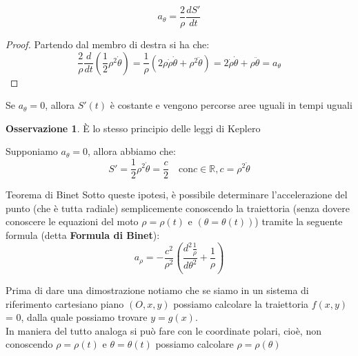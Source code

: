 \documentclass[11pt,a4paper,twoside]{article}
\theoremstyle{definition}
\newtheorem*{oss}{Osservazione}
\begin{document}
\begin{prop}{}{}
	\[ a_\theta = \frac 2 \rho \frac{dS'}{dt} \]
\end{prop}

\begin{proof}
	Partendo dal membro di destra si ha che:
	\[ \frac 2\rho \frac{d}{dt}\left( \frac 12 \rho^2 \dot \theta \right) = \frac 1\rho (2 \rho \dot \rho \dot \theta + \rho^2 \ddot \theta) = 2 \dot \rho \dot \theta + \rho \ddot \theta = a_\theta \]
\end{proof}

\begin{cor}
	Se $a_\theta = 0$, allora $S'(t)$ è costante e vengono percorse aree uguali in tempi uguali
\end{cor}

\begin{oss}
	È lo stesso principio delle leggi di Keplero
\end{oss}

Supponiamo $a_\theta = 0$, allora abbiamo che:
\[ S' = \frac 12 \rho^2 \dot \theta = \frac c2 \quad \text{con} c \in \mathbb R, c = \rho^2 \dot \theta \]

\begin{thm}{Teorema di Binet}{}
	Sotto queste ipotesi, è possibile determinare l'accelerazione del punto (che è tutta radiale) semplicemente conoscendo la traiettoria (senza dovere conoscere le equazioni del moto $\rho = \rho(t)$ e $(\theta = \theta(t))$) tramite la seguente formula (detta \textbf{Formula di Binet}):
	\[ a_\rho = -\frac{c^2}{\rho^2}\left( \frac{d^2\frac 1 \rho}{d\theta^2} + \frac 1 \rho \right) \]
\end{thm}

Prima di dare una dimostrazione notiamo che se siamo in un sistema di riferimento cartesiano piano $(O, x, y)$ possiamo calcolare la traiettoria $f(x, y)$ = 0, dalla quale possiamo trovare $y = g(x)$.\\
In maniera del tutto analoga si può fare con le coordinate polari, cioè, non conoscendo $\rho = \rho(t)$ e $\theta = \theta(t)$ possiamo calcolare $\rho = \rho(\theta)$
\end{document}
